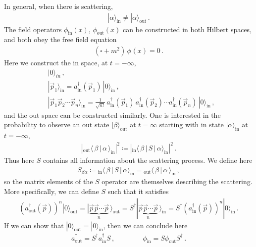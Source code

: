 \documentclass[11pt, onesided]{book}
\theoremstyle{break}
\theoremstyle{break}
\begin{document}
In general, when there is scattering, 
\begin{align*}
|\alpha\rangle_{\text{in}}\neq |\alpha\rangle_{\text{out}}\,.
\end{align*}
The field operators $\phi_{\text{in}}(x)$, $\phi_{\text{out}}(x)$ can be constructed in both Hilbert spaces, and both obey the free field equation
\begin{align*}
(\square + m^2) \,\phi_{\text{}}(x) = 0\,.
\end{align*} 
Here we construct the in space, at $t = -\infty$, 
\begin{align*}
&|0\rangle_{in}\,,\\
&|\vec{p}_1\rangle_{\text{in}} = a_{\text{in}}^\dagger(\vec{p}_1)\,|0\rangle_{\text{in}}\,,\\
&|\vec{p}_1 \vec{p}_2\cdots \vec{p}_n\rangle_{\text{in}}= \frac{1}{\sqrt{n!}} \, a^\dagger_{\text{in}}(\vec{p}_1)\, a^\dagger_{\text{in}}(\vec{p}_2) \cdots a^\dagger_{\text{in}}(\vec{p}_n)\, |0\rangle_{\text{in}}\,,
\end{align*}
and the out space can be constructed similarly. One is interested in the probability to observe an out state $|\beta\rangle_{\text{out}}$ at $t =\infty$ starting with in state $|\alpha \rangle_{\text{in}}$ at $t = -\infty$, 
\begin{align*}
\left| {}_{\text{out}}\langle\, \beta\, |\,\alpha\, \rangle_{\text{in}}\right|^2
\coloneqq \left| {}_{\text{in}}\langle\,\beta\, |\, S\,|\,\alpha\rangle_{\text{in}}\right|^2\,.
\end{align*}
Thus here $S$ contains all information about the scattering process. We define here
\begin{align*}
S_{\beta\alpha}\coloneqq {}_{\text{in}}\langle\,\beta\, |\, S\,|\,\alpha\rangle_{\text{in}} ={}_{\text{out}}\langle\,\beta\, |\,\alpha\,\rangle_{\text{in}}  \,,
\end{align*}
so the matrix elements of the $S$ operator are themselves describing the scattering. More specifically, we can define $S$ such that it satisfies
\begin{align*}
\left( a^\dagger_{\text{out}}(\vec{p})\right)^n |0\rangle_{\text{out}}=
|\underbrace{\vec{p}\vec{p}\cdots\vec{p}}_{n}\,\rangle_{\text{out}} = S^\dagger |\underbrace{\vec{p}\vec{p}\cdots \vec{p}}_{n}\,\rangle_{\text{in}} = S^\dagger \left(a^\dagger_{\text{in}}(\vec{p})\right)^n |0\rangle_{\text{in}}\,.
\end{align*}
If we can show that $|0\rangle_{\text{out}} = |0\rangle_{\text{in}}$, then we can conclude here
\begin{align*}
a^\dagger_{\text{out}} = S^\dagger a^\dagger_{\text{in}} S\,,\qquad\qquad
\phi_{\text{in}} = S\phi_{\text{out}}S^\dagger\,.
\end{align*}
\end{document}

